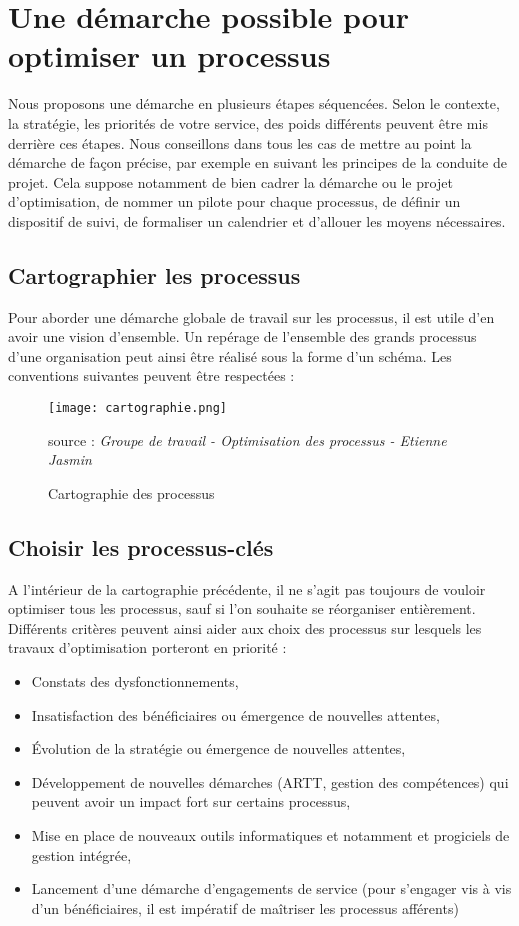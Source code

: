 \section{Une démarche possible pour optimiser un processus\cite{Ref11}}

Nous proposons une démarche en plusieurs étapes séquencées. Selon le contexte, la stratégie, les priorités de votre service, des poids différents peuvent être mis derrière ces étapes. Nous conseillons dans tous les cas de mettre au point la démarche de façon précise, par exemple en suivant les principes de la conduite de projet. Cela suppose notamment de bien cadrer la démarche ou le projet d'optimisation, de nommer un pilote pour chaque processus, de définir un dispositif de suivi, de formaliser un calendrier et d'allouer les moyens nécessaires. 
 \subsection{Cartographier les processus  }
Pour aborder une démarche globale de travail sur les processus, il est utile d'en avoir une vision d'ensemble. Un repérage de l'ensemble des grands processus d'une organisation peut ainsi être réalisé sous la forme d'un schéma. Les conventions suivantes peuvent être respectées : 
\begin{figure}[H]
	\centering
	\texttt{[image: cartographie.png]}
	\caption{Cartographie des processus}{ \begin{center} source : \textit{Groupe de travail - Optimisation des processus - Etienne Jasmin} \end{center}}
	\label{fig:CIMA}
\end{figure}

	\subsection{Choisir les processus-clés}	
	
A l'intérieur de la cartographie précédente, il ne s'agit pas toujours de vouloir optimiser tous les processus, sauf si l'on souhaite se réorganiser entièrement. Différents critères peuvent ainsi aider aux choix des processus sur lesquels les travaux d'optimisation porteront en priorité : 
\begin{itemize}[label=\textbullet, font=\LARGE \color{blue}]
	\item Constats des dysfonctionnements,
	\item Insatisfaction des bénéficiaires ou émergence de nouvelles attentes,
	\item Évolution de la stratégie ou émergence de nouvelles attentes,
	\item Développement de nouvelles démarches (ARTT, gestion des compétences) qui peuvent avoir un impact fort sur certains processus,
	\item Mise en place de nouveaux outils informatiques et notamment et progiciels de gestion intégrée,
	\item Lancement d’une démarche d’engagements de service (pour s’engager vis à vis d’un bénéficiaires, il est impératif de maîtriser les processus afférents)
\end{itemize}
	
